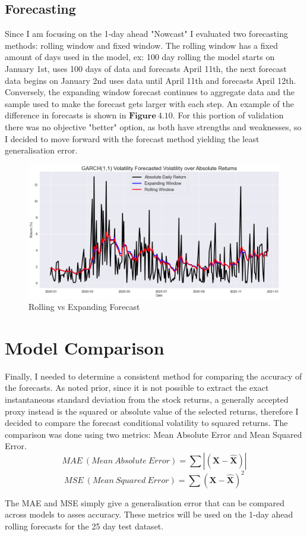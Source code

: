 \subsection{Forecasting}
Since I am focusing on the 1-day ahead "Nowcast" I evaluated two forecasting methods: rolling window and fixed window. The rolling window has a fixed amount of days used in the model, ex: 100 day rolling the model starts on January 1st, uses 100 days of data and forecasts April 11th, the next forecast data begins on January 2nd uses data until April 11th and forecasts April 12th. Conversely, the expanding window forecast continues to aggregate data and the sample used to make the forecast gets larger with each step. An example of the difference in forecasts is shown in $\mathbf{Figure~4.10}$. For this portion of validation there was no objective "better" option, as both have strengths and weaknesses, so I decided to move forward with the forecast method yielding the least generalisation error.  
\begin{figure}[H]
\centering
\includegraphics[scale = 0.35]{images/ForecastRollingExpanding1.png}
\caption{Rolling vs Expanding Forecast}
\label{fig: Fitting Plot}
\end{figure}

\section{Model Comparison}
Finally, I needed to determine a consistent method for comparing the accuracy of the forecasts. As noted prior, since it is not possible to extract the exact instantaneous standard deviation from the stock returns, a generally accepted proxy instead is the squared or absolute value of the selected returns, therefore I decided to compare the forecast conditional volatility to squared returns. The comparison was done using two metrics: Mean Absolute Error and Mean Squared Error.
$$
MAE~(Mean~Absolute~Error) = \sum|(\mathbf{X} - \mathbf{\hat{X}})
|$$ $$
MSE~(Mean~Squared~Error) = \sum(\mathbf{X} - \mathbf{\hat{X}})^2$$

The MAE and MSE simply give a generalisation error that can be compared across models to asses accuracy. These metrics will be used on the 1-day ahead rolling forecasts for the 25 day test dataset. 



